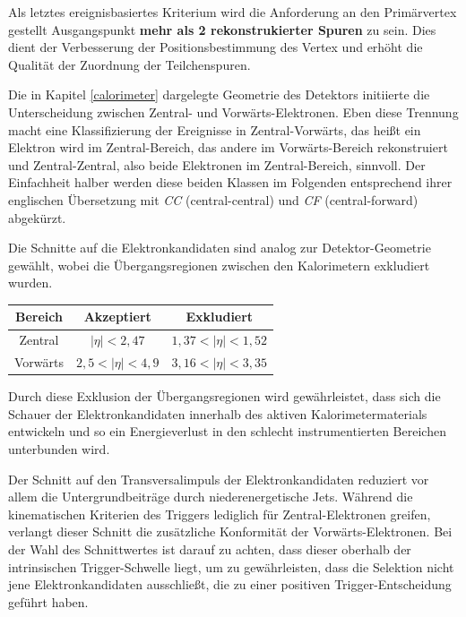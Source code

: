 \begin{description}
        Als letztes ereignisbasiertes Kriterium wird die Anforderung an den
        Primärvertex gestellt Ausgangspunkt \textbf{mehr als 2 rekonstrukierter
        Spuren} zu sein. Dies dient der Verbesserung der Positionsbestimmung
        des Vertex und erhöht die Qualität der Zuordnung der Teilchenspuren.

        Die in Kapitel \ref{calorimeter} dargelegte Geometrie des Detektors
        initiierte die Unterscheidung zwischen Zentral- und
        Vorwärts-Elektronen. Eben diese Trennung macht eine Klassifizierung der
        Ereignisse in Zentral-Vorwärts, das heißt ein Elektron wird im
        Zentral-Bereich, das andere im Vorwärts-Bereich rekonstruiert und
        Zentral-Zentral, also beide Elektronen im Zentral-Bereich, sinnvoll.
        Der Einfachheit halber werden diese beiden Klassen im Folgenden
        entsprechend ihrer englischen Übersetzung mit \emph{CC}
        (central-central) und \emph{CF} (central-forward) abgekürzt. 

        Die Schnitte auf die Elektronkandidaten sind analog zur
        Detektor-Geometrie gewählt, wobei die Übergangsregionen zwischen den
        Kalorimetern exkludiert wurden.
        \begin{table}[h!]
            \centering
            \begin{tabular}{|c|c|c|}
                \hline
                \bf{Bereich} & \bf{Akzeptiert} & \bf{Exkludiert} \\
                \hline \hline
                Zentral  & $|\eta| < 2,47$      & $1,37 < |\eta| < 1,52$ \\
                Vorwärts & $2,5 < |\eta| < 4,9$ & $3,16 < |\eta| < 3,35$ \\
                \hline
            \end{tabular}
        \end{table}

        Durch diese Exklusion der Übergangsregionen wird gewährleistet, dass
        sich die Schauer der Elektronkandidaten innerhalb des aktiven
        Kalorimetermaterials entwickeln und so ein Energieverlust in den
        schlecht instrumentierten Bereichen unterbunden wird.


        Der Schnitt auf den Transversalimpuls der Elektronkandidaten reduziert
        vor allem die Untergrundbeiträge durch niederenergetische Jets. Während
        die kinematischen Kriterien des Triggers lediglich für
        Zentral-Elektronen greifen, verlangt dieser Schnitt die zusätzliche
        Konformität der Vorwärts-Elektronen. Bei der Wahl des Schnittwertes ist
        darauf zu achten, dass dieser oberhalb der intrinsischen
        Trigger-Schwelle liegt, um zu gewährleisten, dass die Selektion nicht
        jene Elektronkandidaten ausschließt, die zu einer positiven
        Trigger-Entscheidung geführt haben.


\end{description}
